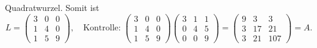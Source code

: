 \begin{beispiel}
Quadratwurzel.
Somit ist
\[
L=
\begin{pmatrix}
3&0&0\\
1&4&0\\
1&5&9
\end{pmatrix}
,\quad\text{Kontrolle:}\;
\begin{pmatrix}
3&0&0\\
1&4&0\\
1&5&9
\end{pmatrix}
\begin{pmatrix}
3&1&1\\
0&4&5\\
0&0&9
\end{pmatrix}
=\begin{pmatrix}
9&3&3\\
3&17&21\\
3&21&107
\end{pmatrix}=A.
\]
\end{beispiel}

